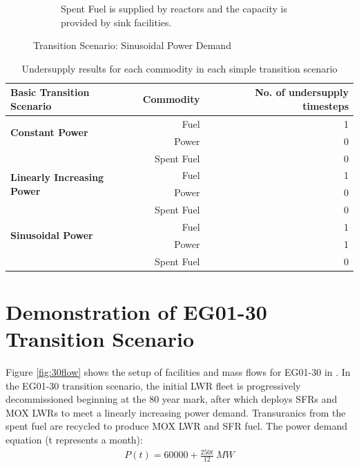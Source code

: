 \begin{figure}[]
\begin{subfigure}[t]{0.6\textwidth}
            \caption{Spent Fuel is supplied by reactors and the capacity is provided by sink facilities.}
            \label{fig:sinetransition-spentfuel}
        \end{subfigure}
        \caption{Transition Scenario: Sinusoidal Power Demand}
    \end{figure}

    \begin{table}[]
        \centering
        \caption {Undersupply results for each commodity in each simple transition scenario}
        \label{tab:transition-scenario-results}
            \scriptsize
            \begin{tabular}{l|rr}	
                \hline
                \textbf{Basic Transition Scenario}    & \textbf{Commodity}    & \textbf{No. of undersupply timesteps} \\ \hline
                \multirow{2}{*}{\textbf{Constant Power}} & Fuel & 1 \\ 
                                                         & Power & 0 \\ 
                                                         & Spent Fuel & 0 \\ \hline
                \multirow{2}{*}{\textbf{Linearly Increasing Power}} & Fuel & 1 \\ 
                                                         & Power & 0 \\ 
                                                         & Spent Fuel & 0 \\ \hline
                \multirow{2}{*}{\textbf{Sinusoidal Power}} & Fuel & 1 \\ 
                                                         & Power & 1 \\ 
                                                         & Spent Fuel & 0 \\ \hline
                \end{tabular}
    \end{table}

\section{\deploy Demonstration of EG01-30 Transition Scenario} 
\label{sec:eg01-30}
Figure \ref{fig:30flow} shows the setup of facilities and mass flows 
for EG01-30 in \Cyclus. 
In the EG01-30 transition scenario, the initial \gls{LWR} fleet is 
progressively decommissioned beginning at the 80 year mark,
after which \deploy deploys \glspl{SFR} and \gls{MOX} \glspl{LWR} to 
meet a linearly increasing power demand. 
Transuranics from the spent fuel are recycled to 
produce \gls{MOX} \gls{LWR} and \gls{SFR} fuel. 
The power demand equation (t represents a month): 
\begin{align}
    P(t) = 60000 + \frac{250t}{12}\ MW
\end{align}

